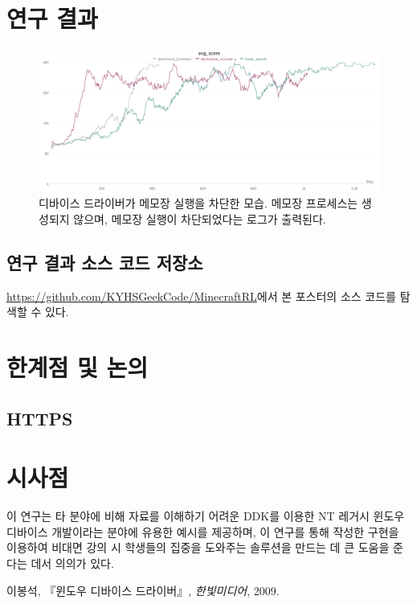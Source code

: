 \documentclass{tudelftposter}
\begin{document}
\section{연구 결과}

\begin{figure}
  \centering
  \includegraphics[width=.4\textwidth]{darkness.png}
  \caption{디바이스 드라이버가 메모장 실행을 차단한 모습. 메모장 프로세스는 생성되지 않으며, 메모장 실행이 차단되었다는 로그가 출력된다.}
  \label{fig:block}
\end{figure}

\subsection{연구 결과 소스 코드 저장소}
\href{https://github.com/KYHSGeekCode/MinecraftRL}{https://github.com/KYHSGeekCode/MinecraftRL}에서 본 포스터의 소스 코드를 탐색할 수 있다.

\section{한계점 및 논의}
\subsection{HTTPS}


\section{시사점}
이 연구는 타 분야에 비해 자료를 이해하기 어려운 DDK를 이용한 NT 레거시 윈도우 디바이스 개발이라는 분야에 유용한 예시를 제공하며, 이 연구를 통해 작성한 구현을 이용하여 비대면 강의 시 학생들의 집중을 도와주는 솔루션을 만드는 데 큰 도움을 준다는 데서 의의가 있다.

\begin{thebibliography}{1}
    이봉석, 『윈도우 디바이스 드라이버』, {\em 한빛미디어}, 2009.
\end{thebibliography}
\end{document}
